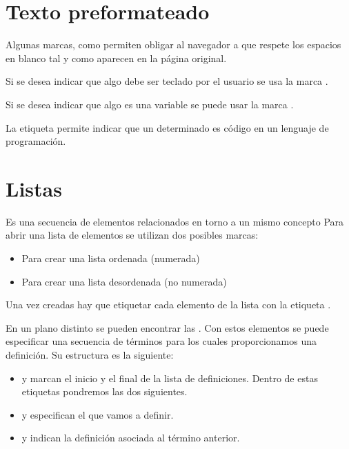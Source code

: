 \documentclass[letterpaper,10pt,spanish]{sphinxmanual}
\begin{document}
\section{Texto preformateado}
\label{\detokenize{tema2:texto-preformateado}}
Algunas marcas, como  permiten obligar al navegador a que respete los espacios en blanco tal y como aparecen en la página original.

Si se desea indicar que algo debe ser teclado por el usuario se usa la marca .

Si se desea indicar que algo es una variable se puede usar la marca .

La etiqueta  permite indicar que un determinado es código en un lenguaje de programación.


\section{Listas}
\label{\detokenize{tema2:listas}}
Es una secuencia de elementos relacionados en torno a un mismo concepto Para abrir una lista de elementos se utilizan dos posibles marcas:
\begin{itemize}
\item {} 
 Para crear una lista ordenada (numerada)

\item {} 
 Para crear una lista desordenada (no numerada)

\end{itemize}

Una vez creadas hay que etiquetar cada elemento de la lista con la etiqueta .

En un plano distinto se pueden encontrar las . Con estos elementos se puede especificar una secuencia de términos para los cuales proporcionamos una definición. Su estructura es la siguiente:
\begin{itemize}
\item {} 
 y  marcan el inicio y el final de la lista de definiciones. Dentro de estas etiquetas pondremos las dos siguientes.

\item {} 
 y  especifican el  que vamos a definir.

\item {} 
 y  indican la definición asociada al término anterior.

\end{itemize}
\end{document}
